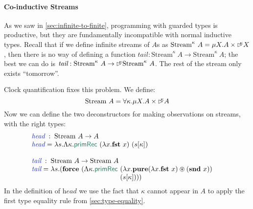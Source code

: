 \documentclass[natbib]{sigplanconf}
\newcommand{\elim}[1]{\textcolor{elim}{\textsf{#1}}}
\newcommand{\kw}[1]{\textbf{#1}}
\newcommand{\tyname}[1]{\textrm{#1}}
\newcommand{\ident}[1]{\textit{#1}}
\newcommand{\defn}[1]{\textcolor{defnd}{\ident{#1}}}
\newcommand{\delay}[1]{\mathord{\rhd\kern-0.4em^{#1}}}
\begin{document}
\paragraph{Co-inductive Streams} As we saw in
\autoref{sec:infinite-to-finite}, programming with guarded types is
productive, but they are fundamentally incompatible with normal
inductive types. Recall that if we define infinite streams of $A$s as
$\tyname{Stream}^\kappa~A = \mu X. A \times \delay\kappa X$, then
there is no way of defining a function $\ident{tail} :
\tyname{Stream}^\kappa~A \to \tyname{Stream}^\kappa~A$; the best we
can do is $\ident{tail} : \tyname{Stream}^\kappa~A \to
\delay\kappa\tyname{Stream}^\kappa~A$. The rest of the stream only
exists ``tomorrow''.

Clock quantification fixes this problem. We define:
\begin{displaymath}
  \tyname{Stream}~A = \forall \kappa. \mu X. A \times \delay\kappa A
\end{displaymath}
Now we can define the two deconstructors for making observations on
streams, with the right types:
\begin{displaymath}
  \begin{array}{@{}l}
    \begin{array}{@{}l@{\hspace{0.3em}}c@{\hspace{0.3em}}l}
      \defn{head} &:& \tyname{Stream}~A \to A \\
      \defn{head} &=& \lambda s. \Lambda \kappa. \elim{primRec}~(\lambda x. \kw{fst}~x)~(s[\kappa]) \\
    \end{array}\\
    \\
    \begin{array}{@{}l@{\hspace{0.3em}}c@{\hspace{0.3em}}l}
      \defn{tail} &:& \tyname{Stream}~A \to \tyname{Stream}~A \\
      \defn{tail} &=& \lambda s. (\kw{force}~(\Lambda \kappa. \elim{primRec}~
      \begin{array}[t]{@{}l}
        (\lambda x. \kw{pure}(\lambda x. \kw{fst}~x) \circledast (\kw{snd}~x)) \\
        (s[\kappa])))
      \end{array}
    \end{array}
  \end{array}
\end{displaymath}
In the definition of $\ident{head}$ we use the fact that $\kappa$
cannot appear in $A$ to apply the first type equality rule from
\autoref{sec:type-equality}.
\end{document}

